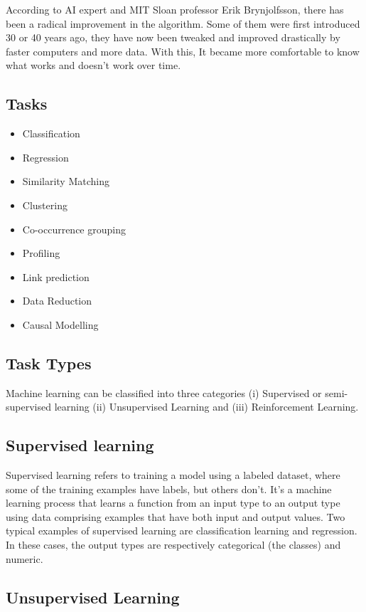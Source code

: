 According to AI expert and MIT Sloan professor Erik Brynjolfsson, there has been a radical improvement in the algorithm. Some of them were first introduced 30 or 40 years ago, they have now been tweaked and improved drastically by faster computers and more data. With this, It became more comfortable to know what works and doesn't work over time.

\subsection{Tasks}
\begin{itemize}
\item Classification
\item Regression
\item Similarity Matching
\item Clustering
\item Co-occurrence grouping
\item Profiling
\item Link prediction
\item Data Reduction
\item Causal Modelling
\end{itemize}

\subsection{Task Types}

Machine learning can be classified into three categories (i) Supervised or semi-supervised learning (ii) Unsupervised Learning and (iii) Reinforcement Learning.

\subsection*{Supervised learning}

Supervised learning \cite{sammut2011encyclopedia} refers to training a model using a labeled dataset, where some of the training examples have labels, but others don’t. It's a machine learning process that learns a function from an input type to an output type using data comprising examples that have both input and output values. Two typical examples of supervised learning are classification learning and regression. In these cases, the output types are respectively categorical (the classes) and numeric. 

\subsection*{Unsupervised Learning}

